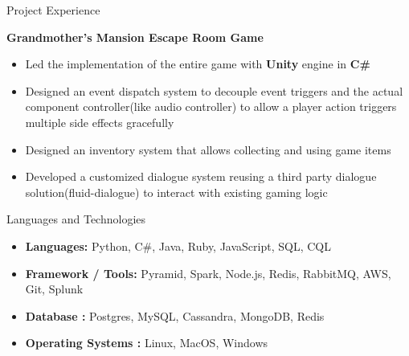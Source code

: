 \documentclass[]{mcdowellcv}
\begin{document}
\begin{cvsection}{Project Experience}
        \begin{cvsubsection}{}{}{}
        \textbf{Grandmother's Mansion Escape Room Game}
        \begin{itemize}
\item Led the implementation of the entire game with \textbf{Unity} engine in \textbf{C\#}
\item Designed an event dispatch system to decouple event triggers and the actual component controller(like audio controller) to allow a player action triggers multiple side effects gracefully
\item Designed an inventory system that allows collecting and using game items
\item Developed a customized dialogue system reusing a third party dialogue solution(fluid-dialogue) to interact with existing gaming logic
            \end{itemize}
           \end{cvsubsection} 
	\end{cvsection}
	
    
    
\begin{cvsection}{Languages and Technologies}
		\begin{cvsubsection}{}{}{}	
			\begin{itemize}
				\item \textbf{Languages:} Python, C\#, Java, Ruby, JavaScript, SQL, CQL
				\item \textbf{Framework / Tools:} Pyramid, Spark, Node.js, Redis, RabbitMQ, AWS, Git, Splunk
                \item \textbf{Database :} Postgres, MySQL, Cassandra, MongoDB, Redis
                \item \textbf{Operating Systems :} Linux, MacOS, Windows
			\end{itemize}
		\end{cvsubsection}
	\end{cvsection}
	
    
    
	
	
\end{document}
